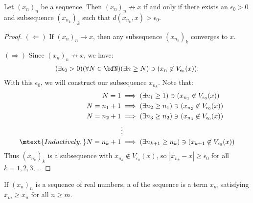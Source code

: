     \begin{proposition}
        Let $(x_n)_n$ be a sequence. Then $(x_n)_n \not\rightarrow x$ if and only if there exists an $\epsilon_0 > 0$ and subsequence $(x_{n_k})_k$ such that $d(x_{n_k},x) > \epsilon_0$.
    \end{proposition}
        \begin{proof}
            $(\Leftarrow)$ If $(x_n)_n \rightarrow x$, then any subsequence $(x_{n_k})_k$ converges to $x$.

            $(\Rightarrow)$ Since $(x_n)_n \not\rightarrow x$, we have:
                \begin{equation*}
                \begin{split}
                    (\exists \epsilon_0 > 0)(\forall N \in \bfN)(\exists n \geq N) \ni (x_n \not\in V_{\epsilon_0}(x)).
                \end{split}
                \end{equation*}
            With this $\epsilon_0$, we will construct our subsequence $x_{n_k}$. Note that:
                \begin{equation*}
                \begin{split}
                    N = 1 &\implies (\exists n_1 \geq 1) \ni (x_{n_1} \not\in V_{\epsilon_0}(x)) \\
                    N = n_1 + 1 & \implies (\exists n_2 \geq n_1) \ni (x_{n_2} \not\in V_{\epsilon_0}(x)) \\
                    N = n_2 + 1 & \implies (\exists n_3 \geq n_2) \ni (x_{n_3} \not\in V_{\epsilon_0}(x)) \\
                    &\vdots \\
                    \mtext{Inductively,} N = n_k + 1 & \implies (\exists n_{k+1} \geq n_k) \ni (x_{k+1} \not\in V_{\epsilon_0}(x))
                \end{split}
                \end{equation*}
            Thus $(x_{n_k})_k$ is a subsequence with $x_{n_k} \not\in V_{\epsilon_0}(x)$, so $|x_{n_k} - x | \geq \epsilon_0$ for all $k=1,2,3,...$
        \end{proof}

    \begin{definition}
        If $(x_n)_n$ is a sequence of real numbers, a  of the sequence is a term $x_m$ satisfying $x_m \geq x_n$ for all $n \geq m$.
    \end{definition}

